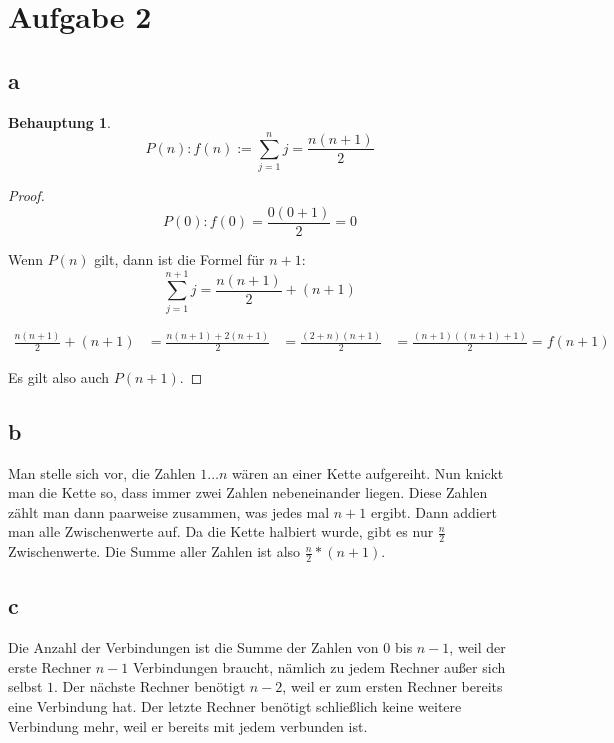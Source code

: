 \documentclass[a4paper,10pt]{article}
\newtheorem*{claim}{Behauptung}
\begin{document}
\section*{Aufgabe 2}

\subsection*{a}

\begin{claim}
 \begin{equation}
  P(n): f(n) := \sum_{j = 1}^{n} j = \frac{n(n + 1)}{2}
 \end{equation}

\end{claim}

\begin{proof}
 \begin{equation*}
  P(0): f(0) = \frac{0(0 + 1)}{2} = 0
 \end{equation*}
 
 Wenn $P(n)$ gilt, dann ist die Formel für $n + 1$:
 \begin{equation*}
  \sum_{j = 1}^{n + 1} j = \frac{n(n + 1)}{2} + (n + 1)
 \end{equation*}
 
 \begin{align*}
  \frac{n(n + 1)}{2} + (n + 1) & = \frac{n(n + 1) + 2(n + 1)}{2}
  & = \frac{(2 + n)(n + 1)}{2}
  & = \frac{(n + 1)((n + 1) + 1)}{2} = f(n + 1)
 \end{align*}

 Es gilt also auch $P(n + 1)$.
\end{proof}

\subsection*{b}

Man stelle sich vor, die Zahlen $1\dots n$ wären an einer Kette aufgereiht.
Nun knickt man die Kette so, dass immer zwei Zahlen nebeneinander liegen.
Diese Zahlen zählt man dann paarweise zusammen, was jedes mal $n + 1$ ergibt.
Dann addiert man alle Zwischenwerte auf.
Da die Kette halbiert wurde, gibt es nur $\frac{n}{2}$ Zwischenwerte.
Die Summe aller Zahlen ist also $\frac{n}{2} * (n + 1)$.

\subsection*{c}

Die Anzahl der Verbindungen ist die Summe der Zahlen von $0$ bis $n - 1$, weil der erste Rechner $n - 1$ Verbindungen braucht, nämlich zu jedem Rechner außer sich selbst $1$.
Der nächste Rechner benötigt $n - 2$, weil er zum ersten Rechner bereits eine Verbindung hat.
Der letzte Rechner benötigt schließlich keine weitere Verbindung mehr, weil er bereits mit jedem verbunden ist.
\end{document}
